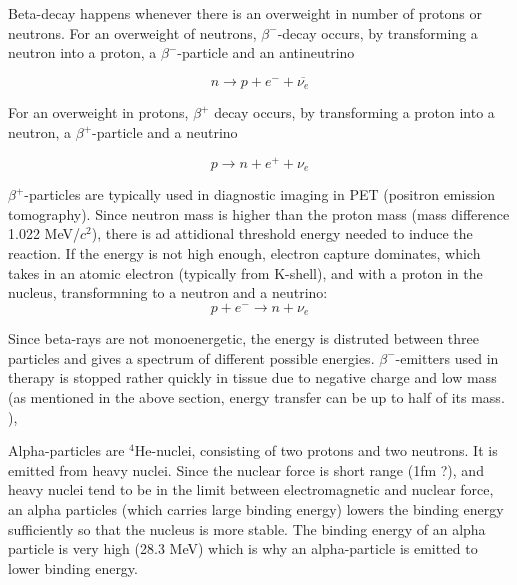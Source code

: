 \documentclass[a4paper,11pt,twoside]{book}
\begin{document}
\noindent
Beta-decay happens whenever there is an overweight in number of protons or neutrons. For an overweight of neutrons, $\beta^-$-decay occurs, by transforming a neutron into a proton, a $\beta^-$-particle and an antineutrino

\begin{equation}
    n \rightarrow p + e^- + \overline{{\nu_e}}
\end{equation}

\noindent
For an overweight in protons, $\beta^+$ decay occurs, by transforming a proton into a neutron, a $\beta^+$-particle and a neutrino

\begin{equation}
    p \rightarrow n + e^+ + {\nu_e}
\end{equation}

$\beta^+$-particles are typically used in diagnostic imaging in PET (positron emission tomography). 
\noindent Since neutron mass is higher than the proton mass (mass difference 1.022 MeV/$c^2$), there is ad attidional threshold energy needed to induce the reaction. If the energy is not high enough, electron capture dominates, which takes in an atomic electron (typically from K-shell), and with a proton in the nucleus, transformning to a neutron and a neutrino:
\begin{equation}
    p + e^- \rightarrow n + \nu_e 
\end{equation}

Since beta-rays are not monoenergetic, the energy is distruted between three particles and gives a spectrum of different possible energies. $\beta^-$-emitters used in therapy is stopped rather quickly in tissue due to negative charge and low mass (as mentioned in the above section, energy transfer can be up to half of its mass. ), 

Alpha-particles are $^{4}$He-nuclei, consisting of two protons and two neutrons. It is emitted from heavy nuclei. Since the nuclear force is short range (1fm ?), and heavy nuclei tend to be in the limit between electromagnetic and nuclear force, an alpha particles (which carries large binding energy) lowers the binding energy sufficiently so that the nucleus is more stable. The binding energy of an alpha particle is very high (28.3 MeV) which is why an alpha-particle is emitted to lower binding energy. 
\end{document}
